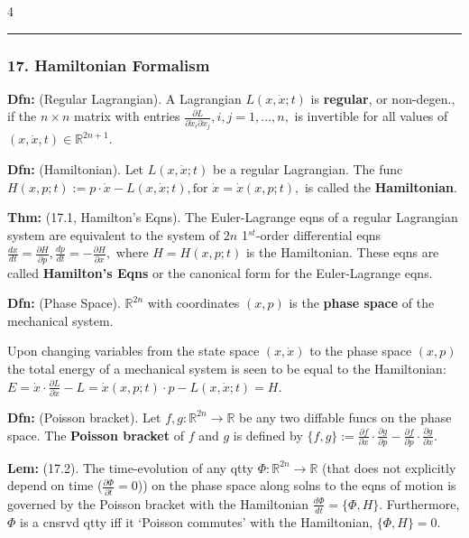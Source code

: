 \documentclass[landscape, 8pt]{extarticle}
\begin{document}
\begin{multicols*}{4}
		\hrule
		\vspace*{-3pt}
		\subsubsection*{\tiny{17. Hamiltonian Formalism}}
		\vspace*{-5pt}
		
		\textbf{Dfn:} (Regular Lagrangian). A Lagrangian $L(x,\dot{x};t)$ is \textbf{regular}, or non-degen., if the $n\times n$ matrix with entries
		$
		\frac{\partial L}{\partial\dot{x}_i\partial\dot{x}_j}, i,j=1,\ldots,n,
		$
		is invertible for all values of $(x,\dot{x},t)\in\mathbb{R}^{2n+1}$.
		
		\textbf{Dfn:} (Hamiltonian). Let $L(x,\dot{x};t)$ be a regular Lagrangian. The func
		$
		H(x,p;t):=p\cdot\dot{x}-L(x,\dot{x};t),\text{for }\dot{x}=\dot{x}(x,p;t),
		$
		is called the \textbf{Hamiltonian}.
		
		\textbf{Thm:} (17.1, Hamilton's Eqns). The Euler-Lagrange eqns of a regular Lagrangian system are equivalent to the system of $2n$ 1$^{st}$-order differential eqns
		$
		\frac{dx}{dt}=\frac{\partial H}{\partial p}, \frac{dp}{dt}=-\frac{\partial H}{\partial x},
		$
		where $H=H(x,p;t)$ is the Hamiltonian. These eqns are called \textbf{Hamilton's Eqns} or the canonical form for the Euler-Lagrange eqns.
		
		\textbf{Dfn:} (Phase Space). $\mathbb{R}^{2n}$ with coordinates $(x,p)$ is the \textbf{phase space} of the mechanical system.
		
		Upon changing variables from the state space $(x,\dot{x})$ to the phase space $(x,p)$ the total energy of a mechanical system is seen to be equal to the Hamiltonian:
		$
		E=\dot{x}\cdot\frac{\partial L}{\partial\dot{x}}-L=\dot{x}(x,p;t)\cdot p-L(x,\dot{x};t)=H.
		$
		
		\textbf{Dfn:} (Poisson bracket). Let $f,g:\mathbb{R}^{2n}\to\mathbb{R}$ be any two diffable funcs on the phase space. The \textbf{Poisson bracket} of $f$ and $g$ is defined by
		$
		\{f,g\}:=\frac{\partial f}{\partial x}\cdot\frac{\partial g}{\partial p}-\frac{\partial f}{\partial p}\cdot\frac{\partial g}{\partial x}.
		$
		
		\textbf{Lem:} (17.2). The time-evolution of any qtty $\Phi:\mathbb{R}^{2n}\to\mathbb{R}$ (that does not explicitly depend on time ($\frac{\partial\Phi}{\partial t}=0$)) on the phase space along solns to the eqns of motion is governed by the Poisson bracket with the Hamiltonian
		$
		\frac{d\Phi}{dt}=\{\Phi,H\}.
		$
		Furthermore, $\Phi$ is a cnsrvd qtty iff it `Poisson commutes' with the Hamiltonian, $\{\Phi,H\}=0$.
		

\end{multicols*}
\end{document}
